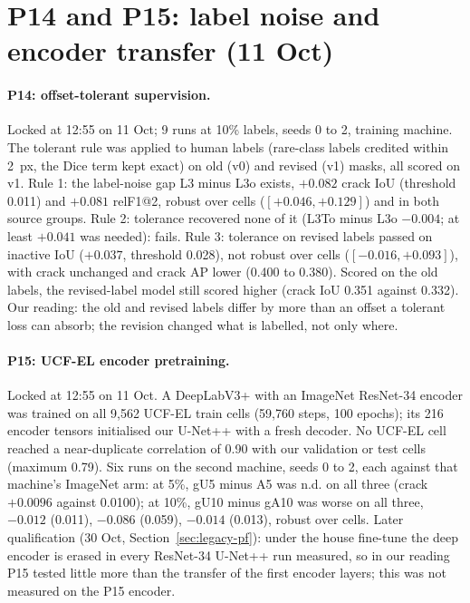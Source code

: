 \section{P14 and P15: label noise and encoder transfer (11 Oct)}\label{sec:pseries-p14}

\paragraph{P14: offset-tolerant supervision.} Locked at 12:55 on 11 Oct; 9 runs at 10\% labels, seeds 0 to 2, training machine.
The tolerant rule was applied to human labels (rare-class labels credited within 2~px, the Dice term kept exact) on old (v0) and
revised (v1) masks, all scored on v1. Rule 1: the label-noise gap L3 minus L3o exists, $+0.082$ crack IoU (threshold 0.011) and
$+0.081$ relF1@2, robust over cells ($[+0.046, +0.129]$) and in both source groups. Rule 2: tolerance recovered none of it (L3To minus
L3o $-0.004$; at least $+0.041$ was needed): fails. Rule 3: tolerance on revised labels passed on inactive IoU ($+0.037$, threshold
0.028), not robust over cells ($[-0.016, +0.093]$), with crack unchanged and crack AP lower (0.400 to 0.380). Scored on the old
labels, the revised-label model still scored higher (crack IoU 0.351 against 0.332). Our reading: the old and revised labels differ by more
than an offset a tolerant loss can absorb; the revision changed what is labelled, not only where.

\paragraph{P15: UCF-EL encoder pretraining.} Locked at 12:55 on 11 Oct. A DeepLabV3+ \citep{chen2018deeplabv3plus} with an ImageNet
ResNet-34 encoder was trained on all 9,562 UCF-EL train cells \citep{fioresi2022ucfel} (59,760 steps, 100 epochs); its 216 encoder
tensors initialised our U-Net++ with a fresh decoder. No UCF-EL cell reached a near-duplicate correlation of 0.90 with our validation
or test cells (maximum 0.79). Six runs on the second machine, seeds 0 to 2, each against that machine's ImageNet arm: at 5\%, gU5
minus A5 was n.d. on all three (crack $+0.0096$ against 0.0100); at 10\%, gU10 minus gA10 was worse on all three, $-0.012$ (0.011),
$-0.086$ (0.059), $-0.014$ (0.013), robust over cells. Later qualification (30 Oct, Section~\ref{sec:legacy-pf}): under the house
fine-tune the deep encoder is erased in every ResNet-34 U-Net++ run measured, so in our reading P15 tested little more than the
transfer of the first encoder layers; this was not measured on the P15 encoder.

